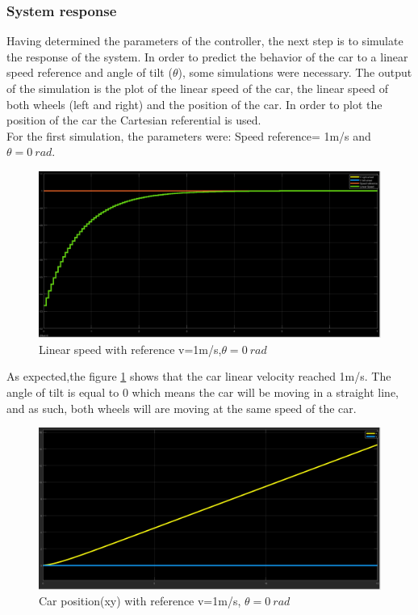 \subsubsection{System response}
\label{sec:des-sim-res}
Having determined the parameters of the controller, the next step is to simulate the response of the system.
In order to predict the behavior of the car to a linear speed reference and angle of tilt ($\theta$), some simulations were necessary. The output of the simulation is the plot of the linear speed of the car, the linear speed of both wheels (left and right) and the position of the car.
In order to plot the position of the car the Cartesian referential is used.\\
For the first simulation, the parameters were: Speed reference= 1m/s and $\theta = 0~\si{rad}$.\\
\begin{figure}[!h]
\centering
\includegraphics[width=1.0\textwidth]{./img/vel10.png}
\caption {\label{fig:sim1 - vel}Linear speed with reference v=1m/s,$\theta = 0~\si{rad}$}
\end{figure}
 As expected,the figure \ref{fig:sim1 - vel} shows that the car linear velocity reached 1m/s. The angle of tilt is equal to 0 which means the car will be moving in a straight line, and as such, both wheels will are moving at the same speed of the car.\\
\newpage
\begin{figure}[!h]
\centering
\includegraphics[width=1.0\textwidth]{./img/xy10.png}
\caption {\label{fig:sim1 - pos}Car position(xy) with reference v=1m/s, $\theta = 0~\si{rad}$}
\end{figure}

